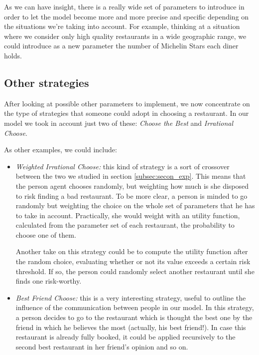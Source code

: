 \documentclass[10pt,a4paper,usenatbib]{article}
\begin{document}
As we can have insight, there is a really wide set of parameters to introduce in order to let the model become more and more precise and specific depending on the situations we're taking into account. For example, thinking at a situation where we consider only high quality restaurants in a wide geographic range, we could introduce as a new parameter the number of Michelin Stars each diner holds.

\subsection{Other strategies}
After looking at possible other parameters to implement, we now concentrate on the type of strategies that someone could adopt in choosing a restaurant. In our model we took in account just two of these: \textit{Choose the Best} and \textit{Irrational Choose}. 

As other examples, we could include:

\begin{itemize}
\item \textit{Weighted Irrational Choose:} this kind of strategy is a sort of crossover between the two we studied in section \ref{subsec:secon_exp}. This means that the person agent chooses randomly, but weighting how much is she disposed to risk finding a bad restaurant. To be more clear, a person is minded to go randomly but weighting the choice on the whole set of parameters that he has to take in account. Practically, she would weight with an utility function, calculated from the parameter set of each restaurant, the probability to choose one of them.

Another take on this strategy could be to compute the  utility function after the random choice, evaluating whether or not its value exceeds a certain risk threshold. If so, the person could randomly select another restaurant until she finds one risk-worthy.

%
%
%
%
%
%
%
%

\item \textit{Best Friend Choose:} this is a very interesting strategy, useful to outline the influence of the communication between people in our model. In this strategy, a person decides to go to the restaurant which is thought the best one by the friend in which he believes the most (actually, his best friend!). In case this restaurant is already fully booked, it could be applied recursively to the second best restaurant in her friend's opinion and so on.
\end{itemize}
\end{document}
